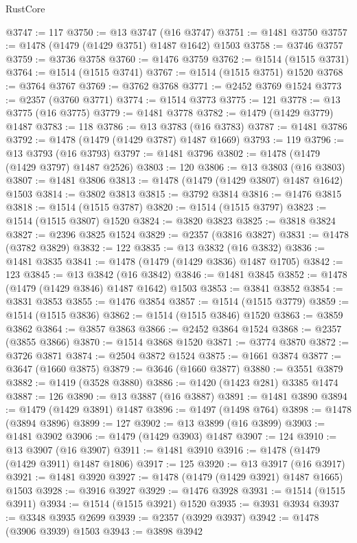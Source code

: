 \begin{lexlean}{RustCore}
\begin{coremodule}
@3747 := 117
@3750 := @13 @3747 (@16 @3747)
@3751 := @1481 @3750
@3757 := @1478 (@1479 (@1429 @3751) @1487 @1642) @1503
@3758 := @3746 @3757
@3759 := @3736 @3758
@3760 := @1476 @3759
@3762 := @1514 (@1515 @3731)
@3764 := @1514 (@1515 @3741)
@3767 := @1514 (@1515 @3751) @1520
@3768 := @3764 @3767
@3769 := @3762 @3768
@3771 := @2452 @3769 @1524
@3773 := @2357 (@3760 @3771)
@3774 := @1514 @3773
@3775 := 121
@3778 := @13 @3775 (@16 @3775)
@3779 := @1481 @3778
@3782 := @1479 (@1429 @3779) @1487
@3783 := 118
@3786 := @13 @3783 (@16 @3783)
@3787 := @1481 @3786
@3792 := @1478 (@1479 (@1429 @3787) @1487 @1669)
@3793 := 119
@3796 := @13 @3793 (@16 @3793)
@3797 := @1481 @3796
@3802 := @1478 (@1479 (@1429 @3797) @1487 @2526)
@3803 := 120
@3806 := @13 @3803 (@16 @3803)
@3807 := @1481 @3806
@3813 := @1478 (@1479 (@1429 @3807) @1487 @1642) @1503
@3814 := @3802 @3813
@3815 := @3792 @3814
@3816 := @1476 @3815
@3818 := @1514 (@1515 @3787)
@3820 := @1514 (@1515 @3797)
@3823 := @1514 (@1515 @3807) @1520
@3824 := @3820 @3823
@3825 := @3818 @3824
@3827 := @2396 @3825 @1524
@3829 := @2357 (@3816 @3827)
@3831 := @1478 (@3782 @3829)
@3832 := 122
@3835 := @13 @3832 (@16 @3832)
@3836 := @1481 @3835
@3841 := @1478 (@1479 (@1429 @3836) @1487 @1705)
@3842 := 123
@3845 := @13 @3842 (@16 @3842)
@3846 := @1481 @3845
@3852 := @1478 (@1479 (@1429 @3846) @1487 @1642) @1503
@3853 := @3841 @3852
@3854 := @3831 @3853
@3855 := @1476 @3854
@3857 := @1514 (@1515 @3779)
@3859 := @1514 (@1515 @3836)
@3862 := @1514 (@1515 @3846) @1520
@3863 := @3859 @3862
@3864 := @3857 @3863
@3866 := @2452 @3864 @1524
@3868 := @2357 (@3855 @3866)
@3870 := @1514 @3868 @1520
@3871 := @3774 @3870
@3872 := @3726 @3871
@3874 := @2504 @3872 @1524
@3875 := @1661 @3874
@3877 := @3647 (@1660 @3875)
@3879 := @3646 (@1660 @3877)
@3880 := @3551 @3879
@3882 := @1419 (@3528 @3880)
@3886 := @1420 (@1423 @281) @3385 @1474
@3887 := 126
@3890 := @13 @3887 (@16 @3887)
@3891 := @1481 @3890
@3894 := @1479 (@1429 @3891) @1487
@3896 := @1497 (@1498 @764)
@3898 := @1478 (@3894 @3896)
@3899 := 127
@3902 := @13 @3899 (@16 @3899)
@3903 := @1481 @3902
@3906 := @1479 (@1429 @3903) @1487
@3907 := 124
@3910 := @13 @3907 (@16 @3907)
@3911 := @1481 @3910
@3916 := @1478 (@1479 (@1429 @3911) @1487 @1806)
@3917 := 125
@3920 := @13 @3917 (@16 @3917)
@3921 := @1481 @3920
@3927 := @1478 (@1479 (@1429 @3921) @1487 @1665) @1503
@3928 := @3916 @3927
@3929 := @1476 @3928
@3931 := @1514 (@1515 @3911)
@3934 := @1514 (@1515 @3921) @1520
@3935 := @3931 @3934
@3937 := @3348 @3935 @2699
@3939 := @2357 (@3929 @3937)
@3942 := @1478 (@3906 @3939) @1503
@3943 := @3898 @3942

\end{coremodule}
\end{lexlean}
